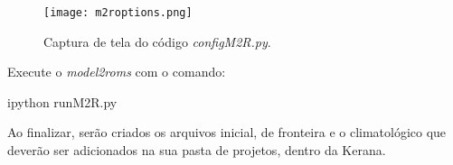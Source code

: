 \begin{figure}[H]
    \centering
    \texttt{[image: m2roptions.png]}
    \caption{Captura de tela do código \textit{configM2R.py}.}
    \label{m2roptions}
\end{figure}
\bigskip

\noindent Execute o \textit{model2roms} com o comando:
\bigskip

\begin{bashcode}
ipython runM2R.py
\end{bashcode}
\bigskip

\noindent Ao finalizar, serão criados os arquivos inicial, de fronteira e o climatológico que deverão ser adicionados na sua pasta de projetos, dentro da Kerana.

\bigskip
   
